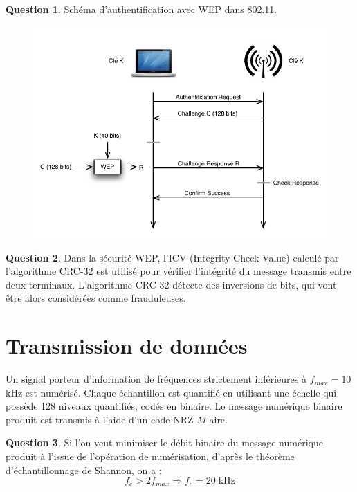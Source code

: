 \documentclass[11pt,english,french]{scrreprt}
\theoremstyle{remark}
\theoremstyle{definition}
\newtheorem{ques}{Question}[section]
\begin{document}
\begin{ques}
	Schéma d'authentification avec WEP dans 802.11.
	
	\begin{figure}[h!]
		\center
		\includegraphics[scale=1]{Exam2009/WEP}
	\end{figure}
\end{ques}

\begin{ques}
	Dans la sécurité WEP, l'ICV (Integrity Check Value) calculé par l'algorithme CRC-32 est utilisé pour vérifier l'intégrité du message transmis entre deux terminaux. L'algorithme CRC-32 détecte des inversions de bits, qui vont être alors considérées comme frauduleuses.
\end{ques}

\clearpage

\section{Transmission de données} %

Un signal porteur d’information de fréquences strictement inférieures à $f_{max} = 10$ kHz est numérisé. Chaque échantillon est quantifié en utilisant une échelle qui possède 128 niveaux quantifiés, codés en binaire. Le message numérique binaire produit est transmis à l’aide d’un code NRZ $M$-aire.

\begin{ques}
	Si l'on veut minimiser le débit binaire du message numérique produit à l'issue de l'opération de numérisation, d'après le théorème d'échantillonnage de Shannon, on a :\[f_e >2f_{max}\Rightarrow f_e=20\;\textrm{kHz}\]
\end{ques}
\end{document}
